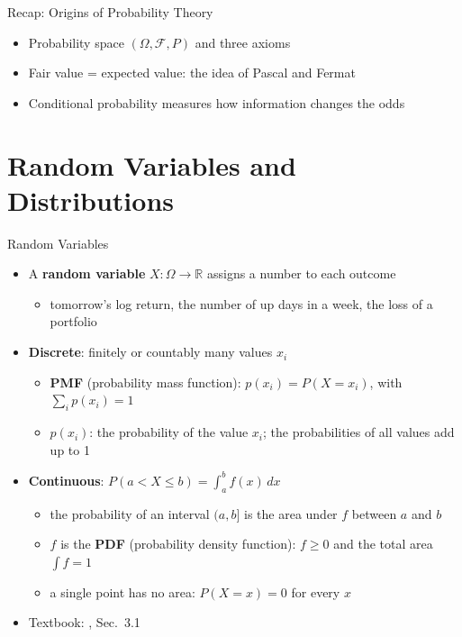 \begin{frame}{Recap: Origins of Probability Theory}
\itemsize{\small}
\begin{itemize}
    \item Probability space $(\Omega, \mathcal{F}, P)$ and three axioms
    \item Fair value = expected value: the idea of Pascal and Fermat
    \item Conditional probability measures how information changes the odds
\end{itemize}
\end{frame}


\section{Random Variables and Distributions}

\begin{frame}{Random Variables}
\itemsize{\footnotesize}
\begin{itemize}
    \item A \textbf{random variable} $X: \Omega \to \mathbb{R}$ assigns a number to each outcome
    \begin{itemize}
        \item tomorrow's log return, the number of up days in a week, the loss of a portfolio
    \end{itemize}
    \item \textbf{Discrete}: finitely or countably many values $x_i$
    \begin{itemize}
        \item \textbf{PMF} (probability mass function): $p(x_i) = P(X = x_i)$, with $\sum_i p(x_i) = 1$
        \item $p(x_i)$: the probability of the value $x_i$; the probabilities of all values add up to 1
    \end{itemize}
    \item \textbf{Continuous}: $P(a < X \le b) = \int_a^b f(x)\,dx$
    \begin{itemize}
        \item the probability of an interval $(a, b]$ is the area under $f$ between $a$ and $b$
        \item $f$ is the \textbf{PDF} (probability density function): $f \ge 0$ and the total area $\int f = 1$
        \item a single point has no area: $P(X = x) = 0$ for every $x$
    \end{itemize}
    \item Textbook: , Sec.~3.1
\end{itemize}
\end{frame}

